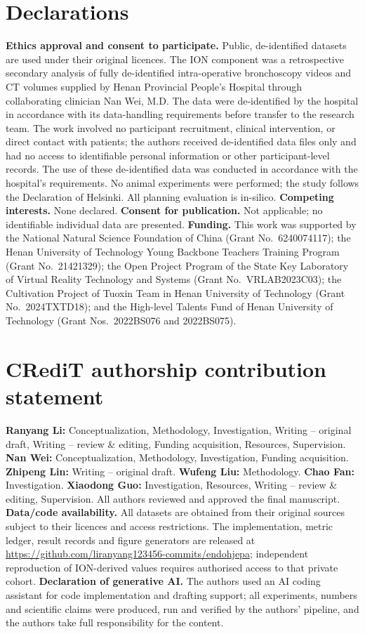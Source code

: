 \documentclass[preprint,12pt]{elsarticle}
\begin{document}
\section*{Declarations}
\textbf{Ethics approval and consent to participate.} Public, de-identified
datasets are used under their original licences. The ION component was a
retrospective secondary analysis of fully de-identified intra-operative
bronchoscopy videos and CT volumes supplied by Henan Provincial People's
Hospital through collaborating clinician Nan Wei, M.D. The data were
de-identified by the hospital in accordance with its data-handling
requirements before transfer to the research team. The work involved no
participant recruitment, clinical intervention, or direct contact with
patients; the authors received de-identified data files only and had no
access to identifiable personal information or other participant-level
records. The use of these de-identified data was conducted in accordance
with the hospital's requirements. No animal experiments were performed; the
study follows the Declaration of Helsinki. All planning evaluation is
in-silico.
\textbf{Competing interests.} None declared.
\textbf{Consent for publication.} Not applicable; no identifiable individual
data are presented.
\textbf{Funding.} This work was supported by the National Natural Science
Foundation of China (Grant No.\ 6240074117); the Henan University of Technology
Young Backbone Teachers Training Program (Grant No.\ 21421329); the Open
Project Program of the State Key Laboratory of Virtual Reality Technology and
Systems (Grant No.\ VRLAB2023C03); the Cultivation Project of Tuoxin Team in
Henan University of Technology (Grant No.\ 2024TXTD18); and the High-level
Talents Fund of Henan University of Technology (Grant Nos.\ 2022BS076 and
2022BS075).
\section*{CRediT authorship contribution statement}
\textbf{Ranyang Li:} Conceptualization, Methodology, Investigation, Writing
-- original draft, Writing -- review \& editing,
Funding acquisition, Resources, Supervision.
\textbf{Nan Wei:} Conceptualization, Methodology, Investigation, Funding
acquisition.
\textbf{Zhipeng Lin:} Writing -- original draft.
\textbf{Wufeng Liu:} Methodology.
\textbf{Chao Fan:} Investigation.
\textbf{Xiaodong Guo:} Investigation, Resources, Writing -- review \& editing,
Supervision.
All authors reviewed and approved the final manuscript.
\textbf{Data/code availability.} All datasets are obtained from their original
sources subject to their licences and access restrictions. The implementation,
metric ledger, result records and figure generators are released at
\url{https://github.com/liranyang123456-commits/endohjepa}; independent
reproduction of ION-derived values requires authorised access to that private
cohort.
\textbf{Declaration of generative AI.} The authors used an AI coding assistant
for code implementation and drafting support; all experiments, numbers and
scientific claims were produced, run and verified by the authors' pipeline,
and the authors take full responsibility for the content.



\end{document}
